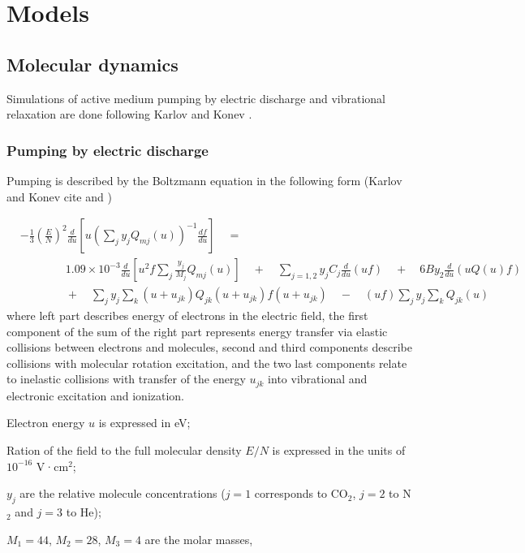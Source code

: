 \documentclass{report}
\begin{document}
\chapter{Models}

\section{Molecular dynamics}
Simulations of active medium pumping by electric discharge and vibrational relaxation are done following Karlov and Konev \cite{Karlov-1978}.

\subsection{Pumping by electric discharge}
Pumping is described by the Boltzmann equation in the following form (Karlov and Konev cite \cite{Holstein-1946} and \cite{Nighan-1970})

\begin{align}\label{eq:boltzmann}
&- \frac{1}{3} \left(\frac{E}{N}\right)^2 \frac{d}{du} \left[u \left( \sum\limits_j y_j Q_{mj}(u) \right)^{-1}\frac{df}{du} \right] \quad = \nonumber \\
&\qquad \qquad 1.09 \times 10^{ - 3}\frac{d}{du}\left[ u^2 f\sum\limits_j \frac{y_j}{M_j} Q_{mj}(u) \right]
\quad  + \quad \sum\limits_{j = 1,2} {y_j}{C_j} \frac{d}{du}(uf)
\quad  + \quad 6B y_2 \frac{d}{du}\left(uQ(u)f \right)\nonumber \\
&\qquad \qquad +\quad\sum\limits_j y_j \sum\limits_k (u + u_{jk})Q_{jk} (u + u_{jk})f(u + u_{jk}) \quad  - \quad (uf)\sum\limits_j y_j \sum\limits_k Q_{jk}(u)
\end{align}
where left part describes energy of electrons in the electric field, the first component of the sum of the right part represents energy transfer via elastic collisions between electrons and molecules, second and third components describe collisions with molecular rotation excitation, and the two last components relate to inelastic collisions with transfer of the energy $u_{jk}$ into vibrational and electronic excitation and ionization.

Electron energy $u$ is expressed in eV;

Ration of the field to the full molecular density $E/N$ is expressed in the units of $10^{-16}$ V·cm$^2$;

$y_j$ are the relative molecule concentrations ($j=1$ corresponds to CO$_2$, $j=2$ to N$_2$ and $j=3$ to He);

$M_1=44$, $M_2=28$, $M_3=4$ are the molar masses,
\end{document}
